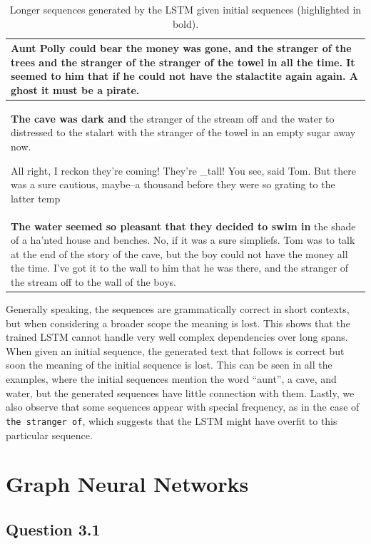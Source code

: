\documentclass{article}
\begin{document}
\begin{table}[t]
\caption{Longer sequences generated by the LSTM given initial sequences (highlighted in bold).}
\label{tab:lst-long-samples}
\centering
\begin{tabular}{p{13cm}}
\hline
\textbf{Aunt} Polly could bear the money was gone, and the stranger of the trees and the stranger of the stranger of the towel in all the time. It seemed to him that if he could not have the stalactite again again. A ghost it must be a pirate. \\
\hline
\textbf{The cave was dark and} the stranger of the stream off and the water to distressed to the stalart with the stranger of the towel in an empty sugar away now.

All right, I reckon they're coming! They're \_tall! You see, said Tom. But there was a sure cautious, maybe--a thousand before they were so grating to the latter temp\\
\hline
\textbf{The water seemed so pleasant that they decided to swim in} the shade of a ha'nted house and benches. No, if it was a sure simpliefs. Tom was to talk at the end of the story of the cave, but the boy could not have the money all the time. I've got it to the wall to him that he was there, and the stranger of the stream off to the wall of the boys.
\end{tabular}
\end{table}

Generally speaking, the sequences are grammatically correct in short contexts, but when considering a broader scope the meaning is lost. This shows that the trained LSTM cannot handle very well complex dependencies over long spans. When given an initial sequence, the generated text that follows is correct but soon the meaning of the initial sequence is lost. This can be seen in all the examples, where the initial sequences mention the word ``aunt'', a cave, and water, but the generated sequences have little connection with them. Lastly, we also observe that some sequences appear with special frequency, as in the case of \texttt{the stranger of}, which suggests that the LSTM might have overfit to this particular sequence.

\section{Graph Neural Networks}

\subsection*{Question 3.1}
\end{document}
